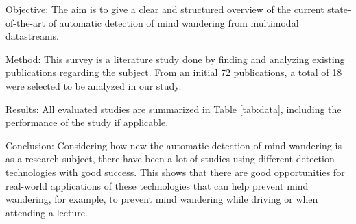 Objective: The aim is to give a clear and structured overview of the current state-of-the-art of automatic detection of mind wandering from multimodal datastreams.

Method: This survey is a literature study done by finding and analyzing existing publications regarding the subject. From an initial 72 publications, a total of 18 were selected to be analyzed in our study.

Results: All evaluated studies are summarized in Table \ref{tab:data}, including the performance of the study if applicable.

Conclusion: Considering how new the automatic detection of mind wandering is as a research subject, there have been a lot of studies using different detection technologies with good success. This shows that there are good opportunities for real-world applications of these technologies that can help prevent mind wandering, for example, to prevent mind wandering while driving or when attending a lecture.